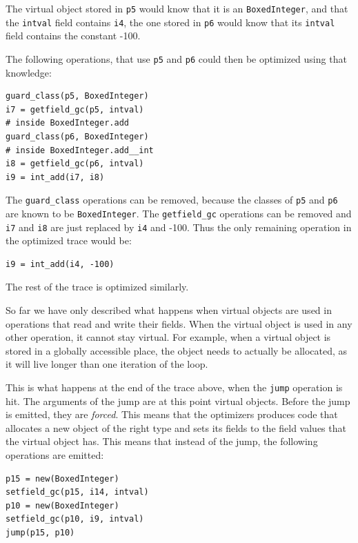 \documentclass{sigplanconf}
\begin{document}
The virtual object stored in \texttt{p5} would know that it is an \texttt{BoxedInteger}, and that
the \texttt{intval} field contains \texttt{i4}, the one stored in \texttt{p6} would know that
its \texttt{intval} field contains the constant -100.

The following operations, that use \texttt{p5} and \texttt{p6} could then be
optimized using that knowledge:

\begin{verbatim}
guard_class(p5, BoxedInteger)
i7 = getfield_gc(p5, intval)
# inside BoxedInteger.add
guard_class(p6, BoxedInteger)
# inside BoxedInteger.add__int
i8 = getfield_gc(p6, intval)
i9 = int_add(i7, i8)
\end{verbatim}

The \texttt{guard\_class} operations can be removed, because the classes of \texttt{p5} and
\texttt{p6} are known to be \texttt{BoxedInteger}. The \texttt{getfield\_gc} operations can be removed
and \texttt{i7} and \texttt{i8} are just replaced by \texttt{i4} and -100. Thus the only
remaining operation in the optimized trace would be:

\begin{verbatim}
i9 = int_add(i4, -100)
\end{verbatim}
    
The rest of the trace is optimized similarly.

So far we have only described what happens when virtual objects are used in
operations that read and write their fields. When the virtual object is used in
any other operation, it cannot stay virtual. For example, when a virtual object
is stored in a globally accessible place, the object needs to actually be
allocated, as it will live longer than one iteration of the loop.

This is what happens at the end of the trace above, when the \texttt{jump} operation
is hit. The arguments of the jump are at this point virtual objects. Before the
jump is emitted, they are \emph{forced}. This means that the optimizers produces code
that allocates a new object of the right type and sets its fields to the field
values that the virtual object has. This means that instead of the jump, the
following operations are emitted:

\begin{verbatim}
p15 = new(BoxedInteger)
setfield_gc(p15, i14, intval)
p10 = new(BoxedInteger)
setfield_gc(p10, i9, intval)
jump(p15, p10)
\end{verbatim}
\end{document}
